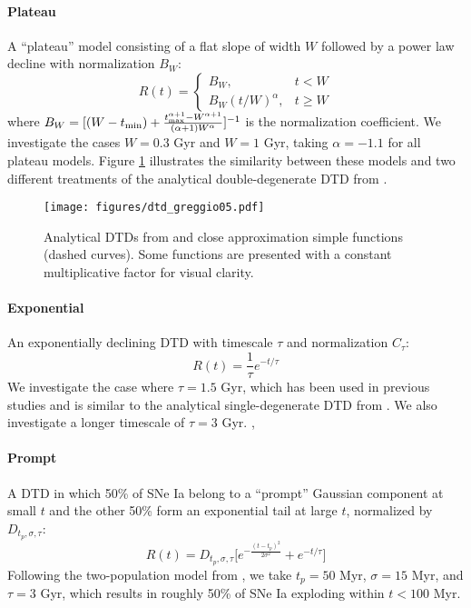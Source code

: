 \documentclass[twocolumn,linenumbers,twocolappendix]{aastex631}
\begin{document}
\paragraph{Plateau} A ``plateau'' model consisting of a flat slope of width $W$ followed by a power law decline with normalization $B_W$:
\begin{equation}
    R(t) = 
    \begin{cases}
        B_W, & t < W \\
        B_W (t/W)^\alpha, & t \ge W
    \end{cases}
    \label{eq:plateau-dtd}
\end{equation}
where $B_W=[(W-t_{\rm min}) + \frac{t_{\rm max}^{\alpha+1} - W^{\alpha+1}}{(\alpha+1)W^\alpha}]^{-1}$ is the normalization coefficient.
We investigate the cases $W=0.3$ Gyr and $W=1$ Gyr, taking $\alpha=-1.1$ for all plateau models. Figure \ref{fig:dtd-greggio05} illustrates the similarity between these models and two different treatments of the analytical double-degenerate DTD from \citet{Greggio2005-AnalyticalRates}.

\begin{figure}
    \centering
    \texttt{[image: figures/dtd\_greggio05.pdf]}
    \caption{Analytical DTDs from \citet[][solid curves]{Greggio2005-AnalyticalRates} and close approximation simple functions (dashed curves). Some functions are presented with a constant multiplicative factor for visual clarity.}
    \label{fig:dtd-greggio05}
\end{figure}

\paragraph{Exponential} An exponentially declining DTD with timescale $\tau$ and normalization $C_\tau$:
\begin{equation}
    R(t) = \frac{1}{\tau} e^{-t/\tau}
    \label{eq:exponential-dtd}
\end{equation}
We investigate the case where $\tau=1.5$ Gyr, which has been used in previous studies \citep[e.g.,][]{Schonrich2009-RadialMixing,Weinberg2017-ChemicalEquilibrium} and is similar to the analytical single-degenerate DTD from \citet{Greggio2005-AnalyticalRates}. We also investigate a longer timescale of $\tau=3$ Gyr. \citet{Matteucci1986-SupernovaEnrichment}, \citet{Stolger2020-ExponentialDTD}

\paragraph{Prompt} A DTD in which 50\% of SNe Ia belong to a ``prompt'' Gaussian component at small $t$ and the other 50\% form an exponential tail at large $t$, normalized by $D_{t_p,\sigma,\tau}$:
\begin{equation}
    R(t) = D_{t_p,\sigma,\tau} \Big[e^{-\frac{(t-t_p)^2}{2\sigma^2}} + e^{-t/\tau}\Big]
    \label{eq:prompt-dtd}
\end{equation}
Following the two-population model from \citet{Mannucci2006-TwoPopulations}, we take $t_p=50$ Myr, $\sigma=15$ Myr, and $\tau=3$ Gyr, which results in roughly 50\% of SNe Ia exploding within $t<100$ Myr.
\end{document}
